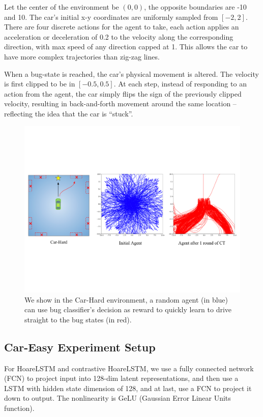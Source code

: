 \documentclass{article}
\begin{document}
Let the center of the environment be $(0, 0)$, the opposite boundaries are -10 and 10. The car's initial x-y coordinates are uniformly sampled from $[-2, 2]$. There are four discrete actions for the agent to take, each action applies an acceleration or deceleration of 0.2 to the velocity along the corresponding direction, with max speed of any direction capped at 1. This allows the car to have more complex trajectories than zig-zag lines. 

When a bug-state is reached, the car's physical movement is altered. The velocity is first clipped to be in $[-0.5, 0.5]$. At each step, instead of responding to an action from the agent, the car simply flips the sign of the previously clipped velocity, resulting in back-and-forth movement around the same location -- reflecting the idea that the car is ``stuck''.

\begin{figure}[ht]
	\centering
	\includegraphics[width=\linewidth]{images/ct_trajectory.pdf}
	\caption{We show in the Car-Hard environment, a random agent (in blue) can use bug classifier's decision as reward to quickly learn to drive straight to the bug states (in red).}
	\label{fig:ct_trajectory}
\end{figure}


\subsection{Car-Easy Experiment Setup}
\label{sec:app-car-easy-exp-setup}

For HoareLSTM and contrastive HoareLSTM, we use a fully connected network (FCN) to project input into 128-dim latent representations, and then use a LSTM with hidden state dimension of 128, and at last, use a FCN to project it down to output. The nonlinearity is GeLU (Gaussian Error Linear Units function). 
\end{document}
